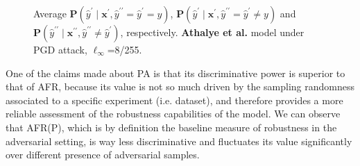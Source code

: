 \begin{figure}[H]
    \caption{Average $\mathbf{P}(\hat{y}^\prime \mid \mathbf{x}^\prime, \hat{y}^{\prime \prime} = \hat{y}^\prime = y)$,
    $\mathbf{P}(\hat{y}^\prime \mid \mathbf{x}^\prime, \hat{y}^{\prime \prime} = \hat{y}^\prime \neq y)$ and
    $\mathbf{P}(\hat{y}^{\prime \prime} \mid \mathbf{x}^{\prime \prime}, \hat{y}^{\prime \prime} \neq \hat{y}^\prime)$,
    respectively. {\color{tab:green} \textbf{Athalye et al.}} model under PGD attack, $\ell_\infty$=8/255.}
    \label{fig:pgd_distributions_bpda}
\end{figure}

One of the claims made about PA is that its discriminative power is superior to that
of AFR, because its value is not so much driven by the sampling randomness associated
to a specific experiment (i.e. dataset), and therefore provides a more reliable
assessment of the robustness capabilities of the model. We can observe that AFR(P),
which is by definition the baseline measure of robustness in the adversarial setting,
is way less discriminative and fluctuates its value significantly over different
presence of adversarial samples.

